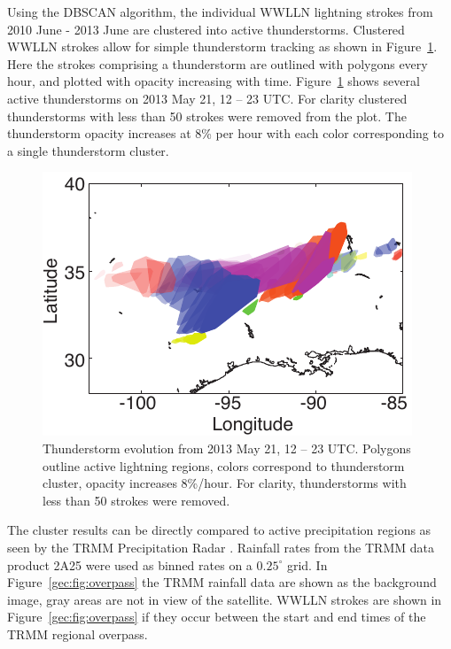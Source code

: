 Using the DBSCAN algorithm, the individual WWLLN lightning strokes from 2010 June - 2013 June are clustered into active thunderstorms.
Clustered WWLLN strokes allow for simple thunderstorm tracking as shown in Figure~\ref{gec:fig:evolution}.
Here the strokes comprising a thunderstorm are outlined with polygons every hour, and plotted with opacity increasing with time.
Figure~\ref{gec:fig:evolution} shows several active thunderstorms on 2013 May 21, 12 -- 23 UTC.
For clarity clustered thunderstorms with less than 50 strokes were removed from the plot.
The thunderstorm opacity increases at 8\% per hour with each color corresponding to a single thunderstorm cluster.

 \begin{figure}[ht!]
    \centering
    \includegraphics[scale=1]{GEC/Figures/evolution.pdf} 
    \caption{Thunderstorm evolution from 2013 May 21, 12 -- 23 UTC.
    		 Polygons outline active lightning regions, colors correspond to thunderstorm cluster, opacity increases 8\%/hour.
		 For clarity, thunderstorms with less than 50 strokes were removed.}
    \label{gec:fig:evolution}
 \end{figure}

The cluster results can be directly compared to active precipitation regions as seen by the TRMM Precipitation Radar \citep{Kawanishi2000}.
Rainfall rates from the TRMM data product 2A25 were used as binned rates on a $0.25^\circ$ grid.
In Figure~\ref{gec:fig:overpass} the TRMM rainfall data are shown as the background image, gray areas are not in view of the satellite.
WWLLN strokes are shown in Figure~\ref{gec:fig:overpass} if they occur between the start and end times of the TRMM regional overpass.

